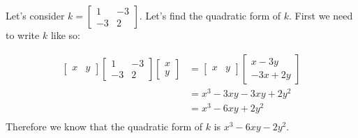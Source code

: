 	\begin{problem}
		Let's consider $k=\begin{bmatrix} 1&-3\\-3&2 \end{bmatrix}$. Let's find the quadratic form of $k$. First we need to write $k$ like so:

		\begin{align}
			\begin{bmatrix} x&y \end{bmatrix} \begin{bmatrix} 1&-3\\-3&2 \end{bmatrix} \begin{bmatrix} x\\y \end{bmatrix} &=\begin{bmatrix} x&y \end{bmatrix} \begin{bmatrix} x-3y\\-3x+2y \end{bmatrix} \\
					 &=x^3-3xy-3xy+2y^2\\
					 &=x^3-6xy+2y^2\\
		\end{align}
		 Therefore we know that the quadratic form of $k$ is $x^3-6xy-2y^2$.
	\end{problem}
